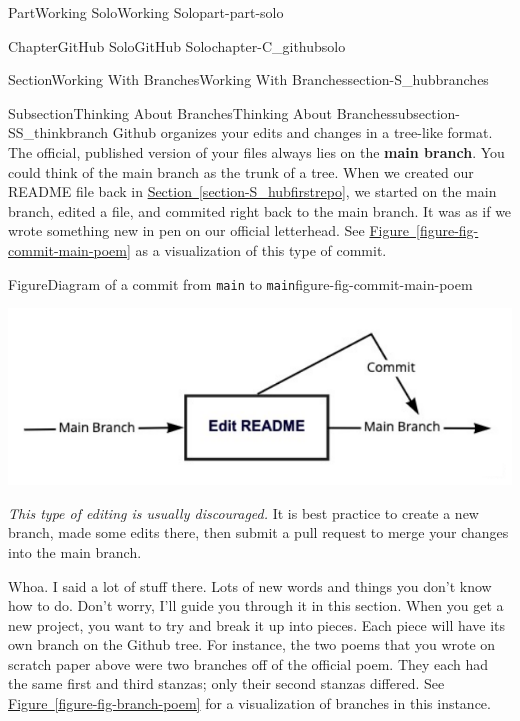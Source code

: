 \documentclass[oneside,10pt,]{book}
\newcommand{\xreffont}{\relax}
\newcommand{\mono}[1]{\texttt{#1}}
\newcommand{\terminology}[1]{\textbf{#1}}
\begin{document}
\begin{partptx}{Part}{Working Solo}{}{Working Solo}{}{}{part-part-solo}
\begin{chapterptx}{Chapter}{GitHub Solo}{}{GitHub Solo}{}{}{chapter-C_githubsolo}
\begin{sectionptx}{Section}{Working With Branches}{}{Working With Branches}{}{}{section-S_hubbranches}
\typeout{************************************************}
%
\begin{subsectionptx}{Subsection}{Thinking About Branches}{}{Thinking About Branches}{}{}{subsection-SS_thinkbranch}
%
%
Github organizes your edits and changes in a tree-like format. The official, published version of your files always lies on the \terminology{main branch}. You could think of the main branch as the trunk of a tree. When we created our README file back in \hyperref[section-S_hubfirstrepo]{Section~{\xreffont\ref{section-S_hubfirstrepo}}}, we started on the main branch, edited a file, and commited right back to the main branch. It was as if we wrote something new in pen on our official letterhead. See \hyperref[figure-fig-commit-main-poem]{Figure~{\xreffont\ref{figure-fig-commit-main-poem}}} as a visualization of this type of commit.%
\begin{figureptx}{Figure}{Diagram of a commit from \mono{main} to \mono{main}}{figure-fig-commit-main-poem}{}%
\begin{image}{0.05}{0.9}{0.05}{}%
\includegraphics[width=\linewidth]{external/commit_main_poem.pdf}
\end{image}%
\tcblower
\end{figureptx}%
\emph{This type of editing is usually discouraged.} It is best practice to create a new branch, made some edits there, then submit a pull request to merge your changes into the main branch.%
\par
Whoa. I said a lot of stuff there. Lots of new words and things you don't know how to do. Don't worry, I'll guide you through it in this section. When you get a new project, you want to try and break it up into pieces. Each piece will have its own branch on the Github tree. For instance, the two poems that you wrote on scratch paper above were two branches off of the official poem. They each had the same first and third stanzas; only their second stanzas differed. See \hyperref[figure-fig-branch-poem]{Figure~{\xreffont\ref{figure-fig-branch-poem}}} for a visualization of branches in this instance.%

\end{subsectionptx}
\end{sectionptx}
\end{chapterptx}
\end{partptx}
\end{document}
